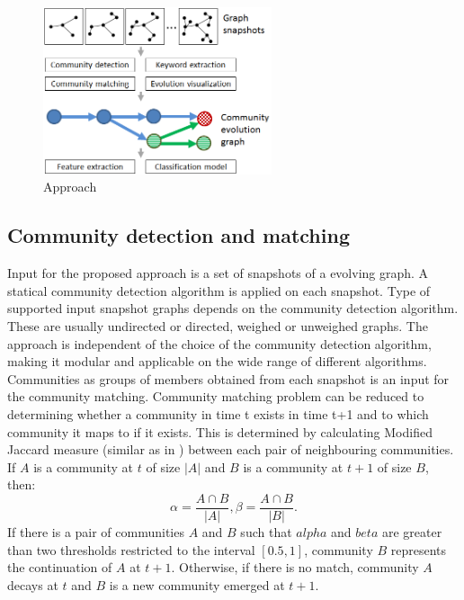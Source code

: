\documentclass{article} %
\begin{document}
\begin{figure}\label{architecture}
   	\begin{center}
   	\includegraphics[width=0.6\textwidth]{architecture.png}
   	\end{center}
   	\caption{Approach}
\end{figure}
\subsection{Community detection and matching}
Input for the proposed approach is a set of snapshots of a evolving graph. A statical community detection algorithm is applied on each snapshot. Type of supported input snapshot graphs depends on the community detection algorithm. These are usually undirected or directed, weighed or unweighed graphs. The approach is independent of the choice of the community detection algorithm, making it modular and applicable on the wide range of different algorithms. Communities as groups of members obtained from each snapshot is an input for the community matching. Community matching problem can be reduced to determining whether a community in time t exists in time t+1 and to which community it maps to if it exists. This is determined by calculating Modified Jaccard measure (similar as in \cite{gliwa2013})  between each pair of neighbouring communities. If $A$ is a community at $t$ of size $|A|$ and $B$ is a community at $t+1$ of size $B$, then:
\begin{equation}
\alpha = \frac{A\cap B}{|A|},
\beta = \frac{A\cap B}{|B|}.
\end{equation}
If there is a pair of communities $A$ and $B$ such that $alpha$ and $beta$ are greater than two thresholds restricted to the interval $[0.5, 1]$, community $B$ represents the continuation of $A$ at $t+1$. Otherwise, if there is no match, community $A$ decays at $t$ and $B$ is a new community emerged at $t+1$. 
\end{document}
